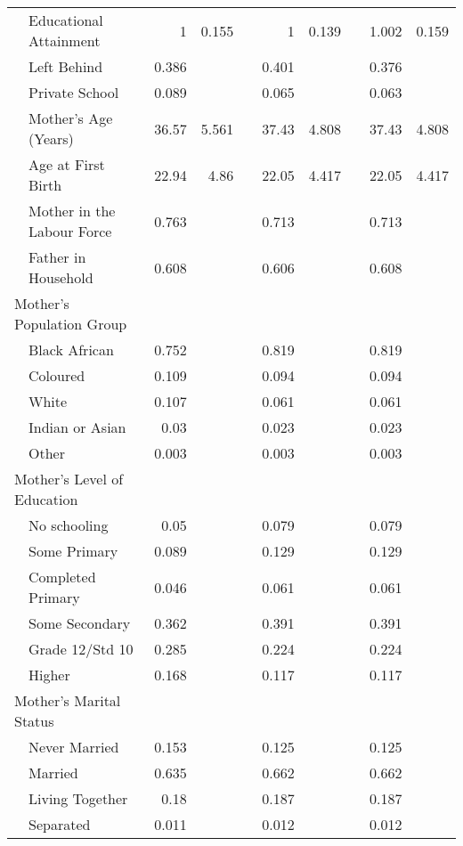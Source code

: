 \begin{table}[ht]
\begin{tabular}{llrrlrrlrr}
   & Educational Attainment &     1 & 0.155 &  &     1 & 0.139 &  & 1.002 & 0.159 \\ 
   & Left Behind & 0.386 &  &  & 0.401 &  &  & 0.376 &  \\ 
   & Private School & 0.089 &  &  & 0.065 &  &  & 0.063 &  \\ 
   & Mother's Age (Years) & 36.57 & 5.561 &  & 37.43 & 4.808 &  & 37.43 & 4.808 \\ 
   & Age at First Birth & 22.94 &  4.86 &  & 22.05 & 4.417 &  & 22.05 & 4.417 \\ 
   & Mother in the Labour Force & 0.763 &  &  & 0.713 &  &  & 0.713 &  \\ 
   & Father in Household & 0.608 &  &  & 0.606 &  &  & 0.608 &  \\ 
   \multicolumn{2}{l}{Mother's Population Group} &  &  &  & & & & \\ & Black African & 0.752 &  &  & 0.819 &  &  & 0.819 &  \\ 
   & Coloured & 0.109 &  &  & 0.094 &  &  & 0.094 &  \\ 
   & White & 0.107 &  &  & 0.061 &  &  & 0.061 &  \\ 
   & Indian or Asian &  0.03 &  &  & 0.023 &  &  & 0.023 &  \\ 
   & Other & 0.003 &  &  & 0.003 &  &  & 0.003 &  \\ 
   \multicolumn{2}{l}{Mother's Level of Education} &  &  &  & & & & \\ & No schooling &  0.05 &  &  & 0.079 &  &  & 0.079 &  \\ 
   & Some Primary & 0.089 &  &  & 0.129 &  &  & 0.129 &  \\ 
   & Completed Primary & 0.046 &  &  & 0.061 &  &  & 0.061 &  \\ 
   & Some Secondary & 0.362 &  &  & 0.391 &  &  & 0.391 &  \\ 
   & Grade 12/Std 10 & 0.285 &  &  & 0.224 &  &  & 0.224 &  \\ 
   & Higher & 0.168 &  &  & 0.117 &  &  & 0.117 &  \\ 
   \multicolumn{2}{l}{Mother's Marital Status} &  &  &  & & & & \\ & Never Married & 0.153 &  &  & 0.125 &  &  & 0.125 &  \\ 
   & Married & 0.635 &  &  & 0.662 &  &  & 0.662 &  \\ 
   & Living Together &  0.18 &  &  & 0.187 &  &  & 0.187 &  \\ 
   & Separated & 0.011 &  &  & 0.012 &  &  & 0.012 &  \\ 

\end{tabular}
\end{table}

